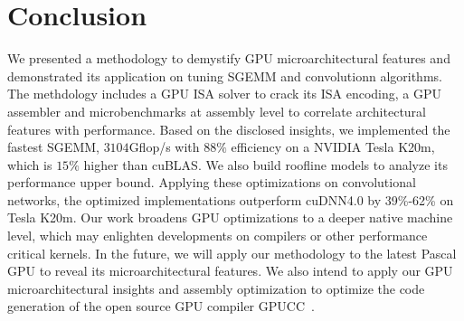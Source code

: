 \section{Conclusion}
\label{sec:conclusion}
We presented a methodology to demystify GPU microarchitectural features and demonstrated its 
application on tuning SGEMM and convolutionn algorithms. 
The methdology includes a GPU ISA solver to crack its ISA encoding, a GPU
assembler and microbenchmarks at assembly level to correlate architectural
features with performance.
Based on the disclosed insights, we implemented the
fastest SGEMM,  $3104$Gflop/s with $88\%$ efficiency on a NVIDIA Tesla K20m, which is $15\%$ higher than cuBLAS. 
We also build roofline models to analyze its performance upper bound. 
Applying these optimizations on convolutional networks, the optimized implementations outperform cuDNN4.0 by 39\%-62\% on Tesla K20m.
Our work broadens GPU optimizations to a deeper native machine level,
which may enlighten developments on
compilers or other performance critical kernels.
In the future, we will apply our methodology to the latest Pascal GPU to reveal its microarchitectural features.
We also intend to apply our GPU microarchitectural insights and assembly
optimization to optimize the code generation of the open source GPU compiler
GPUCC~\cite{wu2016gpucc}.
